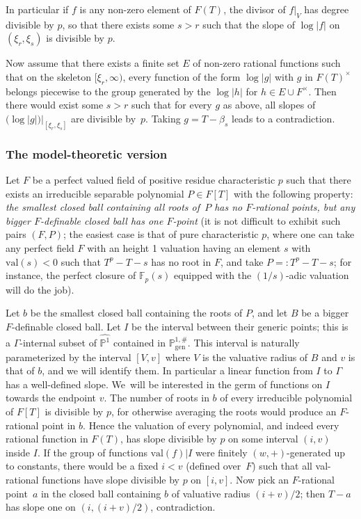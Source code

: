 \documentclass[JEP,XML,SOM,Unicode,ThmDefs,NoEqCountersInSection,published]{cedram}
\newcommand{\abs}[1]{\mathopen|#1\mathclose|}
\newcommand{\val}{\mathrm{val}}
\renewcommand{\P}{\mathbb P}
\newcommand{\F}{\mathbb F}
\theoremstyle{plain}
\theoremstyle{definition}
\begin{document}
\begin{rema}
In particular if $f$ is any non-zero element
of $F(T)$, the divisor
of $f|_V$ has degree divisible by $p$, so that there
exists some $s>r$ such that the slope of $\log \abs f$ on $(\xi_r,\xi_s)$ is divisible by $p$.

Now assume that there exists a finite set
$E$ of non-zero rational functions such
that on the skeleton $[\xi_r,\infty)$, every function of the form
$\log \abs g$ with $g$
in $F(T)^\times$ belongs piecewise to the group generated by
the $\log \abs h$ for $h\in E\cup F^\times$.
Then there would exist some $s>r$
such
that for every $g$ as above,
all slopes of $(\log \abs g)|_{[\xi_r,\xi_s]}$
are divisible by~$p$.
Taking $g=T-\beta_s$
leads to a contradiction.

\subsubsection{The model-theoretic version}
Let $F$ be a perfect valued field of
positive residue characteristic $p$
such that there exists an irreducible
separable
polynomial $P\in F[T]$ with the following
property: \textit{the smallest closed
ball containing
all roots of~$P$ has no $F$-rational points, but any
bigger $F$-definable closed ball has one $F$-point}
(it is not difficult to exhibit such pairs
$(F,P)$; the easiest case
is that of pure characteristic $p$, where one can take
any perfect field $F$ with an height 1 valuation
having an element $s$ with $\val(s)<0$
such that $T^p-T-s$ has no root in $F$, and
take $P=:T^p-T-s$; for instance, the perfect closure
of $\F_p(s)$ equipped
with the $(1/s)$-adic valuation will do the job).

Let $b$ be the smallest closed ball
containing the roots of $P$, and let
$B$ be a bigger $F$-definable
closed ball. Let $I$ be the interval between their generic points; this is
a
$\Gamma$-internal subset of $\widehat{\P^1}$
contained in $\P^{1,\#}_{\mathrm{gen}}$.
This interval is naturally parameterized by the interval $[V,v]$ where $V$
is the valuative radius of $B$ and $v$ is that of $b$,
and we will identify them. In particular a linear function
from $I$ to $\Gamma$
has a well-defined slope. We~will be interested in the germ of functions on $I$ towards
the endpoint $v$.
The number of roots in $b$ of every
irreducible polynomial of $F[T]$ is divisible
by $p$,
for otherwise averaging the roots would produce an $F$-rational
point in $b$. Hence the valuation of every polynomial,
and indeed every rational function in $F(T)$, has slope divisible by $p$
on some interval $(i,v)$
inside $I$. If the group of functions $\val(f) | I$
were finitely $(w,+)$-generated
up to constants, there would be a fixed $i<v$ (defined over~$F$) such that all
val-rational functions have slope divisible by $p$ on $[i,v]$. Now pick an
$F$\nobreakdash-rational point~$a$ in the closed ball containing $b$ of valuative
radius $(i+v)/2$; then $T-a$ has slope one on $(i, (i+v)/2)$, contradiction.
\end{rema}
\end{document}
